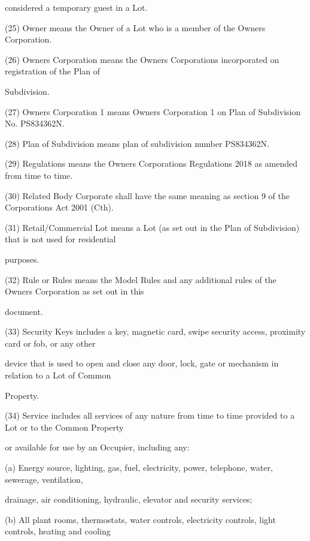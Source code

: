 \documentclass{article}
\begin{document}
{\fontsize{10.02}{1}considered a temporary guest in a Lot. }

{\fontsize{9.962}{1}(25) Owner means the Owner of a Lot who is a member of the Owners Corporation. }

{\fontsize{9.962}{1}(26) Owners Corporation means the Owners Corporations incorporated on registration of the Plan of }

{\fontsize{10.02}{1}Subdivision. }

{\fontsize{9.962}{1}(27) Owners Corporation 1 means Owners Corporation 1 on Plan of Subdivision No. PS834362N. }

{\fontsize{9.962}{1}(28) Plan of Subdivision means plan of subdivision number PS834362N. }

{\fontsize{9.962}{1}(29) Regulations means the Owners Corporations Regulations 2018 as amended from time to time. }

{\fontsize{9.962}{1}(30) Related Body Corporate shall have the same meaning as section 9 of the Corporations Act 2001 (Cth). }

{\fontsize{9.962}{1}(31) Retail/Commercial Lot means a Lot (as set out in the Plan of Subdivision) that is not used for residential }

{\fontsize{10.02}{1}purposes. }

{\fontsize{9.962}{1}(32) Rule or Rules means the Model Rules and any additional rules of the Owners Corporation as set out in this }

{\fontsize{10.02}{1}document. }

{\fontsize{9.962}{1}(33) Security Keys includes a key, magnetic card, swipe security access, proximity card or fob, or any other }

{\fontsize{10.02}{1}device that is used to open and close any door, lock, gate or mechanism in relation to a Lot of Common }

{\fontsize{10.02}{1}Property. }

{\fontsize{9.962}{1}(34) Service includes all services of any nature from time to time provided to a Lot or to the Common Property }

{\fontsize{10.02}{1}or available for use by an Occupier, including any: }

{\fontsize{9.962}{1}(a) Energy source, lighting, gas, fuel, electricity, power, telephone, water, sewerage, ventilation, }

{\fontsize{10.02}{1}drainage, air conditioning, hydraulic, elevator and security services; }

{\fontsize{9.962}{1}(b) All plant rooms, thermostats, water controls, electricity controls, light controls, heating and cooling }
\end{document}
